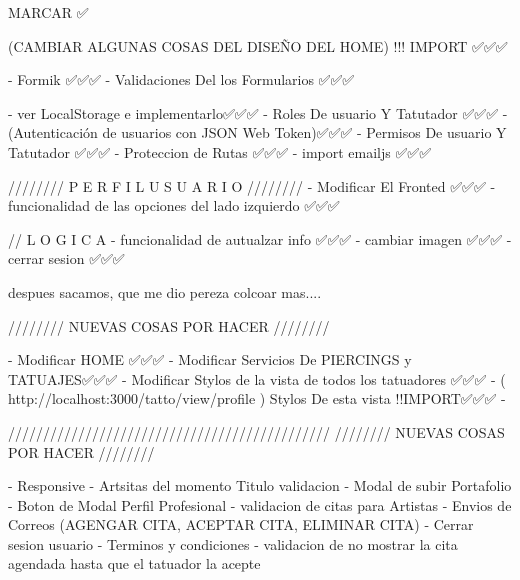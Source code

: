 
MARCAR ✅

(CAMBIAR ALGUNAS COSAS DEL DISEÑO DEL HOME) !!! IMPORT  ✅✅✅

    - Formik ✅✅✅
    - Validaciones Del los Formularios ✅✅✅

    - ver LocalStorage e implementarlo✅✅✅
    - Roles De usuario Y Tatutador ✅✅✅
    - (Autenticación de usuarios con JSON Web Token)✅✅✅
    - Permisos De usuario Y Tatutador ✅✅✅
    - Proteccion de Rutas ✅✅✅
    - import emailjs ✅✅✅



////////   P E R F I L   U S U A R I O   ////////  
    - Modificar El Fronted ✅✅✅
    - funcionalidad de las opciones del lado izquierdo ✅✅✅

    // L O G I C A
    - funcionalidad de autualzar info ✅✅✅
    - cambiar imagen ✅✅✅
    - cerrar sesion ✅✅✅

despues sacamos, que me dio pereza colcoar mas....

////////   NUEVAS COSAS POR HACER    ////////  

    - Modificar HOME ✅✅✅
    - Modificar Servicios De PIERCINGS y TATUAJES✅✅✅
    - Modificar Stylos de la vista de todos los tatuadores ✅✅✅
    - ( http://localhost:3000/tatto/view/profile )  Stylos De esta vista !!IMPORT✅✅✅
    -


//////////////////////////////////////////////
////////   NUEVAS COSAS POR HACER    //////// 

    - Responsive 
    - Artsitas del momento Titulo validacion 
    - Modal de subir Portafolio 
    - Boton de Modal Perfil Profesional
    - validacion de citas para Artistas
    - Envios de Correos (AGENGAR CITA,  ACEPTAR CITA, ELIMINAR CITA)
    - Cerrar sesion usuario 
    - Terminos y condiciones 
    - validacion de no mostrar la cita agendada hasta que el tatuador la acepte







